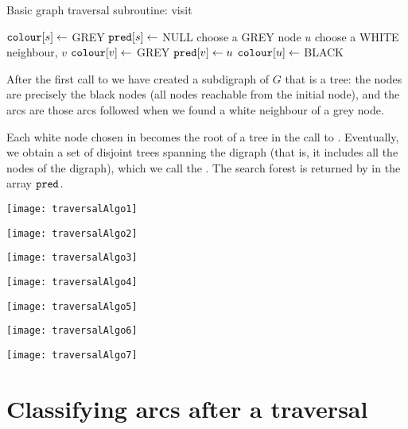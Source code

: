 \begin{algorithm}[H]
  \caption{Basic graph traversal subroutine: visit
    \label{alg:visit}}
\begin{algorithmic}[1]
	\State  $\colour[s] \gets$ GREY 
	\State $\pred[s] \gets$ NULL 
	 
		\State choose a GREY node $u$ 
			\State choose a WHITE neighbour, $v$ 
			\State $\colour[v] \gets $ GREY 
			\State $\pred[v] \gets u$ 
		\Else
			\State $\colour[u] \gets $ BLACK 
		\EndIf
	\EndWhile
\EndFunction
\end{algorithmic}
\end{algorithm}

After the first call to  we have created a subdigraph of $G$ that is a tree: the
nodes are precisely the black nodes (all nodes reachable from the initial node), and the arcs are those arcs followed when we found a white neighbour of a grey node. 

Each white node chosen in  becomes the root of a tree in the call to . Eventually, we obtain a
set of disjoint trees spanning the digraph (that is, it includes all the nodes of the digraph), which we call the
. The search forest  is returned by  in the array $\pred$.

\begin{center} 
\texttt{[image: traversalAlgo1]} 

\texttt{[image: traversalAlgo2]}
 
\texttt{[image: traversalAlgo3]}
 
\texttt{[image: traversalAlgo4]}
 
\texttt{[image: traversalAlgo5]}
 
\texttt{[image: traversalAlgo6]}
  
\texttt{[image: traversalAlgo7]} 
\end{center}
% 


\section{Classifying arcs after a traversal}

